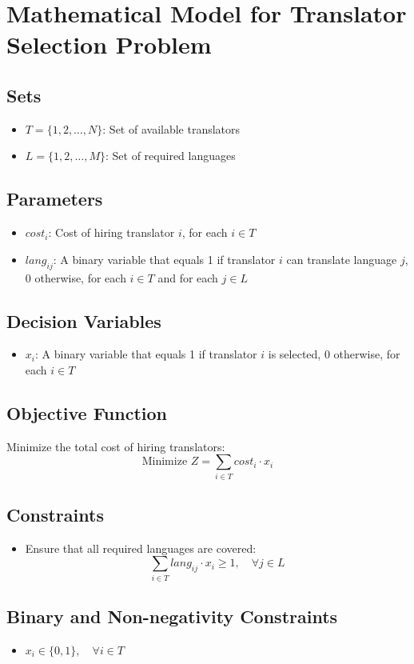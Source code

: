 \documentclass{article}
\begin{document}
\section*{Mathematical Model for Translator Selection Problem}

\subsection*{Sets}
\begin{itemize}
    \item $T = \{1, 2, \ldots, N\}$: Set of available translators
    \item $L = \{1, 2, \ldots, M\}$: Set of required languages
\end{itemize}

\subsection*{Parameters}
\begin{itemize}
    \item $cost_i$: Cost of hiring translator $i$, for each $i \in T$
    \item $lang_{ij}$: A binary variable that equals 1 if translator $i$ can translate language $j$, 0 otherwise, for each $i \in T$ and for each $j \in L$
\end{itemize}

\subsection*{Decision Variables}
\begin{itemize}
    \item $x_i$: A binary variable that equals 1 if translator $i$ is selected, 0 otherwise, for each $i \in T$
\end{itemize}

\subsection*{Objective Function}
Minimize the total cost of hiring translators:
\[
\text{Minimize } Z = \sum_{i \in T} cost_i \cdot x_i
\]

\subsection*{Constraints}
\begin{itemize}
    \item Ensure that all required languages are covered:
\[
\sum_{i \in T} lang_{ij} \cdot x_i \geq 1, \quad \forall j \in L
\]
\end{itemize}

\subsection*{Binary and Non-negativity Constraints}
\begin{itemize}
    \item $x_i \in \{0, 1\}, \quad \forall i \in T$
\end{itemize}
\end{document}
